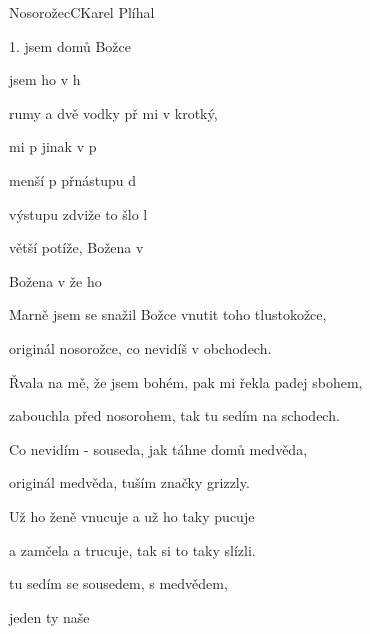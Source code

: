 \begin{song}{Nosorožec}{C}{Karel Plíhal}

\begin{SBVerse}

1.  jsem domů Božce  

      jsem ho v h

    rumy a dvě vodky př mi v krotký,

    mi p  jinak v p

    menší p přnástupu d

   výstupu zdviže  to šlo l

    větší potíže,  Božena v 

    Božena v   že ho 

   \end{SBVerse}

\begin{SBVerse}

Marně jsem se snažil Božce vnutit toho tlustokožce,

   originál nosorožce, co nevidíš v obchodech.

   Řvala na mě, že jsem bohém, pak mi řekla padej sbohem,

   zabouchla před nosorohem, tak tu sedím na schodech.

   Co nevidím - souseda, jak táhne domů medvěda,

   originál medvěda, tuším značky grizzly.

   Už ho ženě vnucuje a už ho taky pucuje

   a zamčela a trucuje, tak si to taky slízli.

\end{SBVerse}

\begin{SBVerse}

tu sedím se sousedem, s  medvědem,

     jeden ty naše 

   \end{SBVerse}

   \end{song}

\pagebreak